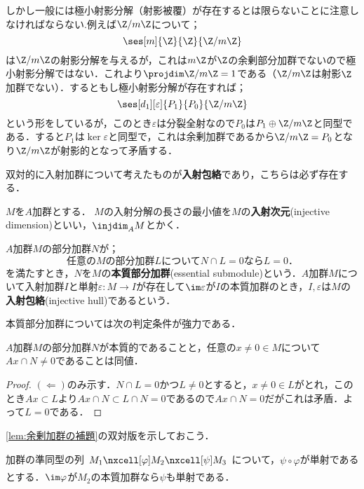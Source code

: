 しかし一般には極小射影分解（射影被覆）が存在するとは限らないことに注意しなければならない.例えば$\Z/m\Z$について；
\[\ses[m]{\Z}{\Z}{\Z/m\Z}\]
は$\Z/m\Z$の射影分解を与えるが，これは$m\Z$が$\Z$の余剰部分加群でないので極小射影分解ではない．これより$\projdim \Z/m\Z=1$である（$\Z/m\Z$は射影$\Z$加群でない）．するともし極小射影分解が存在すれば；
\[\ses[d_1][\varepsilon]{P_1}{P_0}{\Z/m\Z}\]
という形をしているが，このとき$\varepsilon$は分裂全射なので$P_0$は$P_1\oplus\Z/m\Z$と同型である．すると$P_1$は$\ker\varepsilon$と同型で，これは余剰加群であるから$\Z/m\Z=P_0$となり$\Z/m\Z$が射影的となって矛盾する．

双対的に入射加群について考えたものが\textbf{入射包絡}であり，こちらは必ず存在する．

\begin{defi}[入射次元]
	$M$を$A$加群とする． $M$の入射分解の長さの最小値を$M$の\textbf{入射次元}(injective dimension)といい，$\injdim_A M$とかく．
\end{defi}

\begin{defi}[入射包絡]
	$A$加群$M$の部分加群$N$が；
	\[\text{任意の$M$の部分加群$L$について$N\cap L=0$なら$L=0$．}\]
	を満たすとき，$N$を$M$の\textbf{本質部分加群}(essential submodule)という．$A$加群$M$について入射加群$I$と単射$\varepsilon:M\to I$が存在して$\im\varepsilon$が$I$の本質加群のとき，$I,\varepsilon$は$M$の\textbf{入射包絡}(injective hull)であるという．
\end{defi}

本質部分加群については次の判定条件が強力である．
\begin{prop}\label{prop:本質的加群の判定条件}
	$A$加群$M$の部分加群$N$が本質的であることと，任意の$x\neq0\in M$について$Ax\cap N\neq0$であることは同値．
\end{prop}

\begin{proof}
	$(\Longleftarrow)$のみ示す．$N\cap L=0$かつ$L\neq0$とすると，$x\neq0\in L$がとれ，このとき$Ax\subset L$より$Ax\cap N\subset L\cap N=0$であるので$Ax\cap N=0$だがこれは矛盾．よって$L=0$である．
\end{proof}

\ref{lem:余剰加群の補題}の双対版を示しておこう．

\begin{lem}
	加群の準同型の列$\begin{tikzcd}
	M_1\nxcell[\varphi]M_2\nxcell[\psi]M_3
	\end{tikzcd}$について，$\psi\circ\varphi$が単射であるとする．$\im\varphi$が$M_2$の本質加群なら$\psi$も単射である．
\end{lem}

